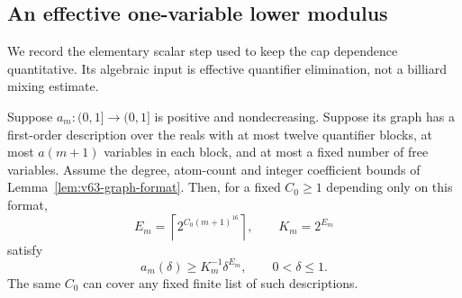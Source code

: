 \subsection{An effective one-variable lower modulus}
We record the elementary scalar step used to keep the cap dependence
quantitative. Its algebraic input is effective quantifier elimination,
not a billiard mixing estimate.

\begin{lemma}
\label{lem:v63-effective-modulus}
Suppose $a_m:(0,1]\to(0,1]$ is positive and nondecreasing. Suppose its
graph has a first-order description over the reals with at most twelve
quantifier blocks, at most $a(m+1)$ variables in each block, and at
most a fixed number of free variables. Assume the degree, atom-count
and integer coefficient bounds of Lemma~\ref{lem:v63-graph-format}.
Then, for a fixed $C_0\ge1$ depending only on this format,
\begin{equation}\label{eq:v63-budget}
 E_m=\left\lceil2^{C_0(m+1)^{16}}\right\rceil,\qquad K_m=2^{E_m}
\end{equation}
satisfy
\begin{equation}\label{eq:v63-scalar-modulus}
 a_m(\delta)\ge K_m^{-1}\delta^{E_m},\qquad0<\delta\le1.
\end{equation}
The same $C_0$ can cover any fixed finite list of such descriptions.
\end{lemma}
